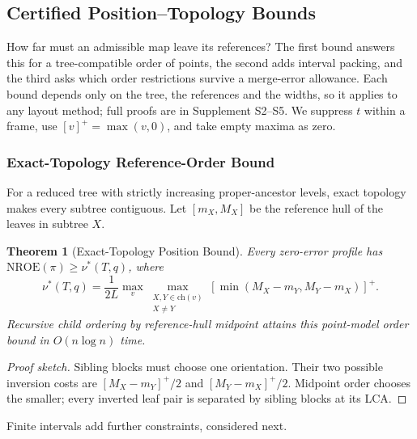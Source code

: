 \documentclass[review]{vgtc}
\newtheorem{theorem}{Theorem}
\newcommand{\nroe}{\mathrm{NROE}}
\begin{document}
\subsection{Certified Position--Topology Bounds}\label{sec:bounds}
How far must an admissible map leave its references? The first bound answers this for a tree-compatible order of points, the second adds interval packing, and the third asks which order restrictions survive a merge-error allowance. Each bound depends only on the tree, the references and the widths, so it applies to any layout method; full proofs are in Supplement S2--S5. We suppress $t$ within a frame, use $[v]^+=\max(v,0)$, and take empty maxima as zero.

\subsubsection{Exact-Topology Reference-Order Bound}
For a reduced tree with strictly increasing proper-ancestor levels, exact topology makes every subtree contiguous. Let $[m_X,M_X]$ be the reference hull of the leaves in subtree $X$.
\begin{theorem}[Exact-Topology Position Bound]\label{thm:order}
Every zero-error profile has $\nroe(\pi)\ge\nu^*(T,q)$, where
\begin{equation}\label{eq:nu}
 \nu^*(T,q)=\frac{1}{2L}\max_v\max_{\substack{X,Y\in\mathrm{ch}(v)\\X\ne Y}}
 [\min(M_X-m_Y,M_Y-m_X)]^+.
\end{equation}
Recursive child ordering by reference-hull midpoint attains this point-model order bound in $O(n\log n)$ time.
\end{theorem}
\begin{proof}[Proof sketch]
Sibling blocks must choose one orientation. Their two possible inversion costs are $[M_X-m_Y]^+/2$ and $[M_Y-m_X]^+/2$. Midpoint order chooses the smaller; every inverted leaf pair is separated by sibling blocks at its LCA.
\end{proof}
Finite intervals add further constraints, considered next.
\end{document}
